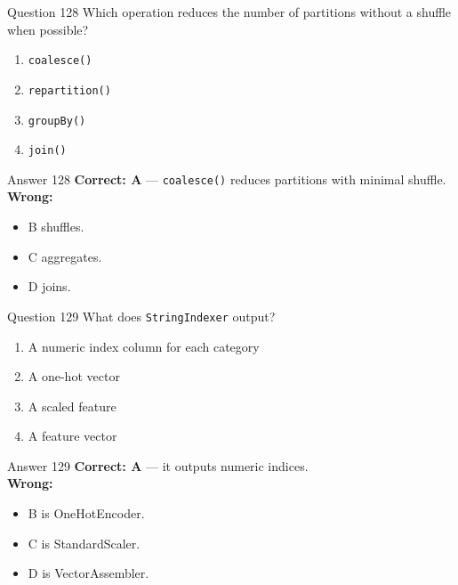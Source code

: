 \documentclass[aspectratio=169,11pt]{beamer}
\begin{document}
	\begin{frame}{Question 128}
		Which operation reduces the number of partitions without a shuffle when possible?
		\begin{enumerate}[label=\Alph*.]
			\item \texttt{coalesce()}
			\item \texttt{repartition()}
			\item \texttt{groupBy()}
			\item \texttt{join()}
		\end{enumerate}
	\end{frame}
	\begin{frame}{Answer 128}
		\textbf{Correct: A} --- \texttt{coalesce()} reduces partitions with minimal shuffle.\\
		\vspace{0.5em}
		\textbf{Wrong:}
		\begin{itemize}
			\item B shuffles.
			\item C aggregates.
			\item D joins.
		\end{itemize}
	\end{frame}
	
	\begin{frame}{Question 129}
		What does \texttt{StringIndexer} output?
		\begin{enumerate}[label=\Alph*.]
			\item A numeric index column for each category
			\item A one-hot vector
			\item A scaled feature
			\item A feature vector
		\end{enumerate}
	\end{frame}
	\begin{frame}{Answer 129}
		\textbf{Correct: A} --- it outputs numeric indices.\\
		\vspace{0.5em}
		\textbf{Wrong:}
		\begin{itemize}
			\item B is OneHotEncoder.
			\item C is StandardScaler.
			\item D is VectorAssembler.
		\end{itemize}
	\end{frame}
	
\end{document}
